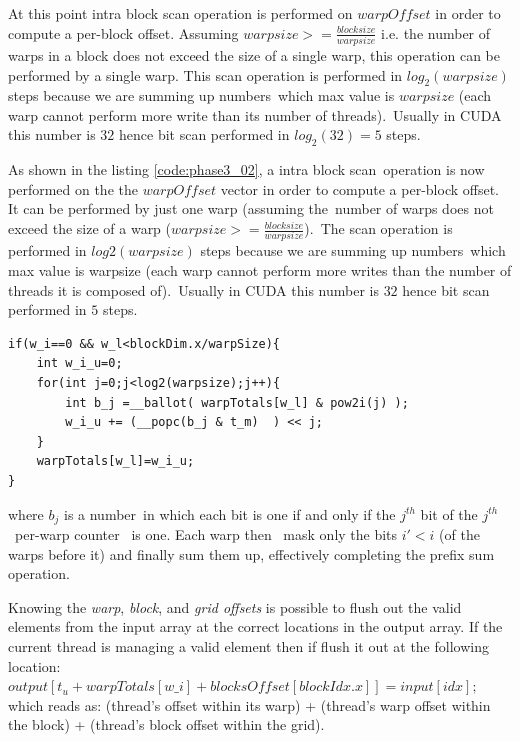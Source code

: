 At this point  intra block scan operation is performed on \(warpOffset\) in order to compute a per-block offset. Assuming \( warpsize >= \frac{blocksize}{warpsize} \) i.e. the number of warps in a block does not exceed the size of a single warp, this operation can be performed by a single warp. This scan operation is performed in \(log_2(warpsize)\) steps because we are summing up numbers which max value is $warpsize$ (each warp cannot perform more write than its number of threads). Usually in CUDA this number is $32$ hence bit scan performed in \(log_2(32)=5\) steps.

As shown in the listing \ref{code:phase3_02}, a intra block scan operation is now performed on the the \(warpOffset\) vector in order to compute a per-block offset. It can be performed by just one warp (assuming the number of warps does not exceed the size of a warp (\( warpsize >= \frac{blocksize}{warpsize} \)). The scan operation is performed in \(log2(warpsize)\) steps because we are summing up numbers which max value is warpsize (each warp cannot perform more writes than the number of threads it is composed of). Usually in CUDA this number is $32$ hence bit scan performed in $5$ steps.
\begin{lstlisting}
if(w_i==0 && w_l<blockDim.x/warpSize){
	int w_i_u=0;
	for(int j=0;j<log2(warpsize);j++){
		int b_j =__ballot( warpTotals[w_l] & pow2i(j) );
		w_i_u += (__popc(b_j & t_m)  ) << j;
	}
	warpTotals[w_l]=w_i_u;
}
\end{lstlisting}
where \(b_j\) is a number in which each bit is one if and only if the \(j^{th}\) bit of the \(j^{th}\) per-warp counter  is one.
Each warp then  mask only the bits \(i'< i\) (of the warps before it)
and finally sum them up, effectively completing the prefix sum operation.


Knowing the \textit{warp}, \textit{block}, and \textit{grid offsets} is possible to flush out the valid elements from the input array at the correct locations in the output array. If the current thread is managing a valid element then if flush it out at the following location: 
$	output[t_u+warpTotals[w\_i]+blocksOffset[blockIdx.x]]= input[idx];$
which reads as: (thread's offset within its warp) + (thread's warp offset within the block) + (thread's block offset within the grid).


